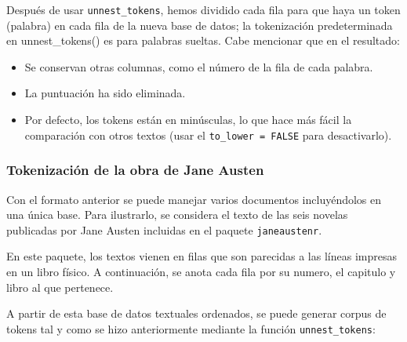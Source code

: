\documentclass[]{article}
\newenvironment{Shaded}{\begin{snugshade}}{\end{snugshade}}
\newcommand{\KeywordTok}[1]{\textcolor[rgb]{0.13,0.29,0.53}{\textbf{#1}}}
\newcommand{\DataTypeTok}[1]{\textcolor[rgb]{0.13,0.29,0.53}{#1}}
\newcommand{\StringTok}[1]{\textcolor[rgb]{0.31,0.60,0.02}{#1}}
\newcommand{\OtherTok}[1]{\textcolor[rgb]{0.56,0.35,0.01}{#1}}
\newcommand{\OperatorTok}[1]{\textcolor[rgb]{0.81,0.36,0.00}{\textbf{#1}}}
\newcommand{\NormalTok}[1]{#1}
\providecommand{\tightlist}{%
  \setlength{\itemsep}{0pt}\setlength{\parskip}{0pt}}
\begin{document}
Después de usar \texttt{unnest\_tokens}, hemos dividido cada fila para
que haya un token (palabra) en cada fila de la nueva base de datos; la
tokenización predeterminada en unnest\_tokens() es para palabras
sueltas. Cabe mencionar que en el resultado:

\begin{itemize}
\tightlist
\item
  Se conservan otras columnas, como el número de la fila de cada
  palabra.
\item
  La puntuación ha sido eliminada.
\item
  Por defecto, los tokens están en minúsculas, lo que hace más fácil la
  comparación con otros textos (usar el \texttt{to\_lower\ =\ FALSE}
  para desactivarlo).
\end{itemize}

\subsubsection{Tokenización de la obra de Jane
Austen}\label{tokenizacion-de-la-obra-de-jane-austen}

Con el formato anterior se puede manejar varios documentos incluyéndolos
en una única base. Para ilustrarlo, se considera el texto de las seis
novelas publicadas por Jane Austen incluidas en el paquete
\texttt{janeaustenr}.

En este paquete, los textos vienen en filas que son parecidas a las
líneas impresas en un libro físico. A continuación, se anota cada fila
por su numero, el capitulo y libro al que pertenece.

\begin{Shaded}
\end{Shaded}

A partir de esta base de datos textuales ordenados, se puede generar
corpus de tokens tal y como se hizo anteriormente mediante la función
\texttt{unnest\_tokens}:
\end{document}
